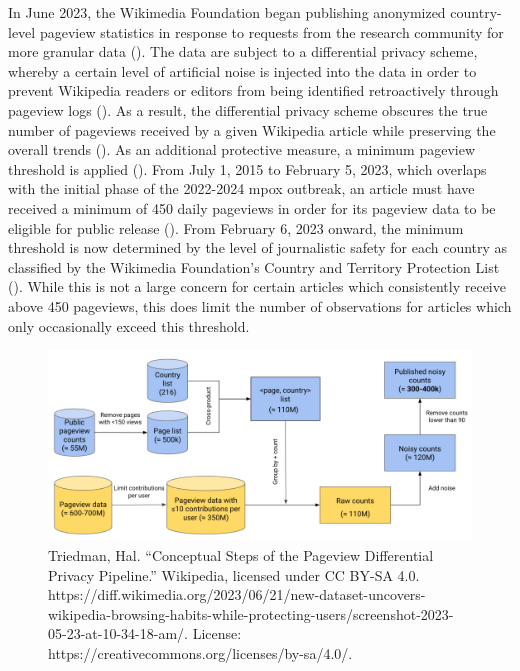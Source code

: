 \documentclass[
  12pt,
]{article}
\begin{document}
In June 2023, the Wikimedia Foundation began publishing anonymized
country-level pageview statistics in response to requests from the
research community for more granular data
(). The data are
subject to a differential privacy scheme, whereby a certain level of
artificial noise is injected into the data in order to prevent Wikipedia
readers or editors from being identified retroactively through pageview
logs (). As a result,
the differential privacy scheme obscures the true number of pageviews
received by a given Wikipedia article while preserving the overall
trends (). As an
additional protective measure, a minimum pageview threshold is applied
(). From July 1, 2015
to February 5, 2023, which overlaps with the initial phase of the
2022-2024 mpox outbreak, an article must have received a minimum of 450
daily pageviews in order for its pageview data to be eligible for public
release (). From February 6, 2023 onward, the
minimum threshold is now determined by the level of journalistic safety
for each country as classified by the Wikimedia Foundation's Country and
Territory Protection List (). While this is not
a large concern for certain articles which consistently receive above
450 pageviews, this does limit the number of observations for articles
which only occasionally exceed this threshold.

\begin{figure}[H]

{\centering \includegraphics{images/wiki-pageview-differential-privacy-pipeline.jpg}

}

\caption{Triedman, Hal. ``Conceptual Steps of the Pageview Differential
Privacy Pipeline.'' Wikipedia, licensed under CC BY-SA 4.0.
https://diff.wikimedia.org/2023/06/21/new-dataset-uncovers-wikipedia-browsing-habits-while-protecting-users/screenshot-2023-05-23-at-10-34-18-am/.
License: https://creativecommons.org/licenses/by-sa/4.0/.}

\end{figure}%
\end{document}
